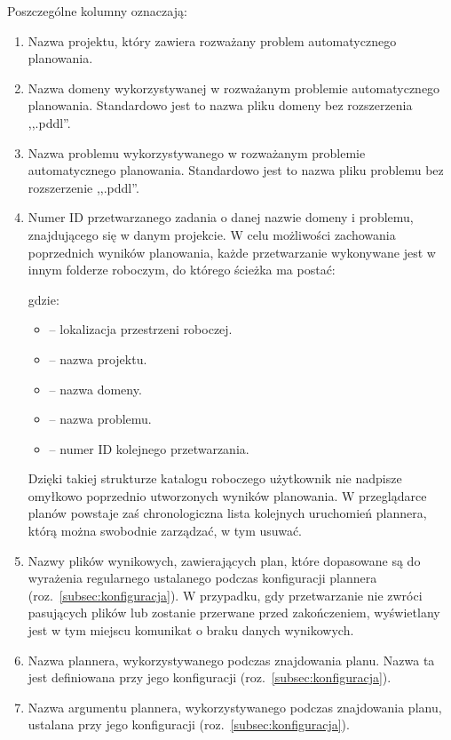 \noindent
Poszczególne kolumny oznaczają:
\begin{enumerate}
\item Nazwa projektu, który zawiera rozważany problem automatycznego planowania.
\item Nazwa domeny wykorzystywanej w rozważanym problemie automatycznego planowania. Standardowo jest to nazwa pliku domeny bez rozszerzenia ,,.pddl''.
\item Nazwa problemu wykorzystywanego w rozważanym problemie automatycznego planowania. Standardowo jest to nazwa pliku problemu bez rozszerzenie ,,.pddl''.
\item Numer ID przetwarzanego zadania o danej nazwie domeny i problemu, znajdującego się w danym projekcie. W celu możliwości zachowania poprzednich wyników planowania, każde przetwarzanie wykonywane jest w innym folderze roboczym, do którego ścieżka ma postać:

\noindent
\centerline{}

\noindent
gdzie:

\begin{itemize}
\item \textbf{} -- lokalizacja przestrzeni roboczej.
\item \textbf{} -- nazwa projektu.
\item \textbf{} -- nazwa domeny.
\item \textbf{} -- nazwa problemu.
\item \textbf{} -- numer ID kolejnego przetwarzania.
\end{itemize}
Dzięki takiej strukturze katalogu roboczego użytkownik nie nadpisze omyłkowo poprzednio utworzonych wyników planowania. W przeglądarce planów powstaje zaś chronologiczna lista kolejnych uruchomień plannera, którą można swobodnie zarządzać, w tym usuwać.
\item Nazwy plików wynikowych, zawierających plan, które dopasowane są do wyrażenia regularnego ustalanego podczas konfiguracji plannera (roz.~\ref{subsec:konfiguracja}). W przypadku, gdy przetwarzanie nie zwróci pasujących plików lub zostanie przerwane przed zakończeniem, wyświetlany jest w tym miejscu komunikat o braku danych wynikowych.
\item Nazwa plannera, wykorzystywanego podczas znajdowania planu. Nazwa ta jest definiowana przy jego konfiguracji (roz.~\ref{subsec:konfiguracja}).
\item Nazwa argumentu plannera, wykorzystywanego podczas znajdowania planu, ustalana przy jego konfiguracji (roz.~\ref{subsec:konfiguracja}).
\end{enumerate}

